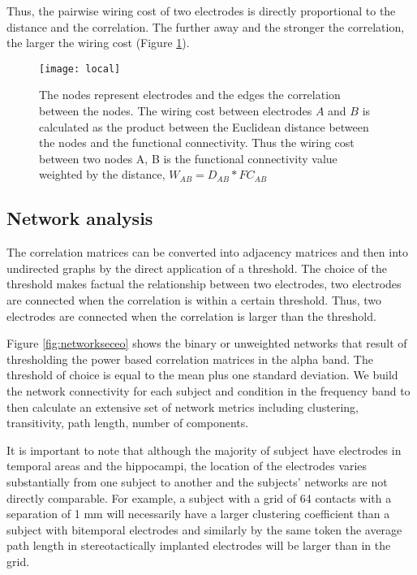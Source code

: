 \documentclass[11pt, onecolumn]{article}
\begin{document}
Thus, the pairwise wiring cost of two electrodes is directly proportional to the distance and the correlation. The further away and the stronger the correlation, the larger the wiring cost (Figure \ref{fig:wc}). 


\begin{figure}[H] 
\centering
    \texttt{[image: local]} 
    \caption{The nodes represent electrodes and the edges the correlation between the nodes. The wiring cost between electrodes $A$ and $B$ is calculated as the product between the Euclidean distance between the nodes and the functional connectivity. Thus the wiring cost between two nodes A, B is the functional connectivity value weighted by the distance, $W_{AB} = D_{AB} * FC_{AB}$} 
    \label{fig:wc} 
    \vspace{4ex}
  \end{figure}%

\subsection{Network analysis}
The correlation matrices can be converted into adjacency matrices and then into undirected graphs by the direct application of a threshold. The choice of the threshold makes factual the relationship between two electrodes, two electrodes are connected when the correlation is within a certain threshold. Thus, two electrodes are connected when the correlation is larger than the threshold.

Figure \ref{fig:networkseceo} shows the binary or unweighted networks that result of thresholding the power based correlation matrices in the alpha band. The threshold of choice is equal to the mean plus one standard deviation.  
We build the network connectivity for each subject and condition in the  frequency band to then calculate an extensive set of network metrics including clustering, transitivity, path length, number of components.


It is important to note that although the majority of subject have electrodes in temporal areas and the hippocampi, the location of the electrodes varies substantially from one subject to another and the subjects’ networks are not directly comparable. For example, a subject with a grid of 64 contacts with a separation of 1 mm will necessarily have a larger clustering coefficient than a subject with bitemporal electrodes and similarly  by the same token the average path length in stereotactically implanted electrodes will be larger than in the grid. 
\end{document}

